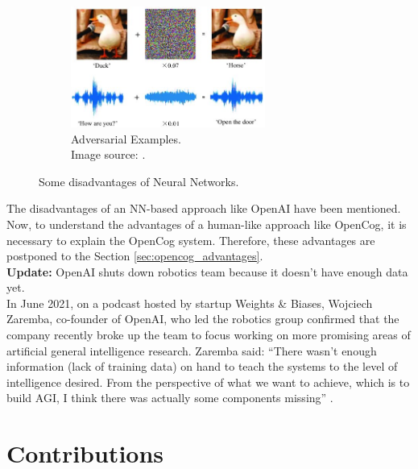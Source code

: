 \begin{figure}
\begin{subfigure}{\linewidth}
	\centering
	\includegraphics[width=0.7\textwidth]{figures/Magistrale/05 - adversarial-examples}
	\caption{Adversarial Examples. \\Image source: \cite{img05}.
	\label{fig:adversarial_examples}}
	\end{subfigure}
\caption{Some disadvantages of Neural Networks.}
\label{fig:disadvantages_nn}
\end{figure} 


The disadvantages of an NN-based approach like OpenAI have been mentioned. Now, to understand the advantages of a human-like approach like OpenCog, it is necessary to explain the OpenCog system. Therefore, these advantages are postponed to the Section \ref{sec:opencog_advantages}. \\

\textbf{Update:} OpenAI shuts down robotics team because it doesn't have enough data yet.\\
In June 2021, on a podcast hosted by startup Weights \& Biases, Wojciech Zaremba, co-founder of OpenAI, who led the robotics group confirmed that the company recently broke up the team to focus working on more promising areas of artificial general intelligence research.
Zaremba said: \enquote{There wasn't enough information (lack of training data) on hand to teach the systems to the level of intelligence desired. From the perspective of what we want to achieve, which is to build AGI, I think there was actually some components missing} \cite{wiggers_openai_2021,oitzman_2021,quach_2021}.


\section{Contributions}\label{sec:contributions}

